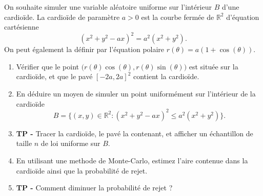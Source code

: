 \documentclass[solutions]{exercices}
\begin{document}
\begin{exercice}
On souhaite simuler une variable aléatoire uniforme sur l'intérieur $B$ d'une cardioïde. La cardioïde de paramètre $a>0$ est la courbe fermée de $\mathbb{R}^2$ d'équation cartésienne
$$(x^2+y^2-ax)^2=a^2(x^2+y^2).$$
On peut également la définir par l'équation polaire
$r(\theta)=a(1+\cos(\theta)).$
\begin{enumerate}
\item
Vérifier que le point $\Big(r(\theta)\cos(\theta),r(\theta)\sin(\theta)\Big)$ est située sur la cardioïde, et que le pavé $[-2a,2a]^2$ contient la cardioïde.
\item
En déduire un moyen de simuler un point uniformément sur l'intérieur de la cardioïde
$$B=\{(x,y)\in \mathbb{R}^2:(x^2+y^2-ax)^2\leq a^2(x^2+y^2)\}.$$
\item
\textbf{TP -} Tracer la cardioïde, le pavé la contenant, et afficher un échantillon de taille $n$ de loi uniforme sur $B$.
\item En utilisant une methode de Monte-Carlo, estimez l'aire contenue dans la cardioïde ainsi que la probabilité de rejet.
\item \textbf{TP -}
Comment diminuer la probabilité de rejet ?
\end{enumerate}
\end{exercice}
\end{document}
